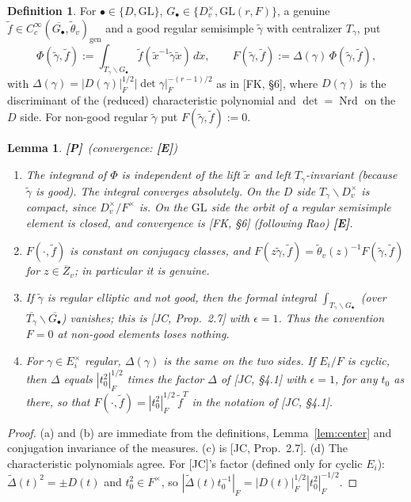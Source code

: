 \documentclass[12pt]{article}
\newcommand{\ov}[1]{\overline{#1}}
\newcommand{\eps}{\epsilon}
\newcommand{\gen}{\mathrm{gen}}
\newcommand{\Nrd}{\operatorname{Nrd}}
\newcommand{\GL}{\mathrm{GL}}
\newcommand{\Zb}{\ov{Z}}
\newcommand{\Pv}{\textbf{[P]}}
\newcommand{\Ev}{\textbf{[E]}}
\theoremstyle{plain}
\newtheorem{lemma}[theorem]{Lemma}
\theoremstyle{definition}
\newtheorem{definition}[theorem]{Definition}
\begin{document}
\begin{definition}\label{def:oi}
For $\bullet\in\{D,\GL\}$, $G_\bullet\in\{D_v^\times,\GL(r,F)\}$, a genuine $\tilde f\in C_c^\infty(\ov{G_\bullet},\tilde\theta_v)_\gen$ and a good regular semisimple $\tilde\gamma$ with centralizer $T_\gamma$, put
\[ \Phi(\tilde\gamma,\tilde f):=\int_{T_\gamma\backslash G_\bullet}\tilde f(\tilde x^{-1}\tilde\gamma\tilde x)\,d\dot x,\qquad F(\tilde\gamma,\tilde f):=\Delta(\gamma)\,\Phi(\tilde\gamma,\tilde f), \]
with $\Delta(\gamma)=|D(\gamma)|_F^{1/2}|\det\gamma|_F^{-(r-1)/2}$ as in [FK, \S6], where $D(\gamma)$ is the discriminant of the (reduced) characteristic polynomial and $\det=\Nrd$ on the $D$ side. For non-good regular $\tilde\gamma$ put $F(\tilde\gamma,\tilde f):=0$.
\end{definition}

\begin{lemma}\label{lem:oiprops}\Pv\ (convergence: \Ev)
\begin{enumerate}[label=(\alph*)]
\item The integrand of $\Phi$ is independent of the lift $\tilde x$ and left $T_\gamma$-invariant (because $\tilde\gamma$ is good). The integral converges absolutely. On the $D$ side $T_\gamma\backslash D_v^\times$ is compact, since $D_v^\times/F^\times$ is. On the $\GL$ side the orbit of a regular semisimple element is closed, and convergence is [FK, \S6] (following Rao) \Ev.
\item $F(\cdot,\tilde f)$ is constant on conjugacy classes, and $F(z\tilde\gamma,\tilde f)=\tilde\theta_v(z)^{-1}F(\tilde\gamma,\tilde f)$ for $z\in\Zb_v$; in particular it is genuine.
\item If $\tilde\gamma$ is regular elliptic and not good, then the formal integral $\int_{T_\gamma\backslash G_\bullet}$ (over $\ov{T_\gamma}\backslash\ov{G_\bullet}$) vanishes; this is [JC, Prop.~2.7] with $\eps=1$. Thus the convention $F=0$ at non-good elements loses nothing.
\item For $\gamma\in E_i^\times$ regular, $\Delta(\gamma)$ is the same on the two sides. If $E_i/F$ is cyclic, then $\Delta$ equals $|t_0^2|_F^{1/2}$ times the factor $\Delta$ of [JC, \S4.1] with $\eps=1$, for any $t_0$ as there, so that $F(\cdot,\tilde f)=|t_0^2|_F^{1/2}\,\tilde f^{T}$ in the notation of [JC, \S4.1].
\end{enumerate}
\end{lemma}
\begin{proof}
(a) and (b) are immediate from the definitions, Lemma~\ref{lem:center} and conjugation invariance of the measures. (c) is [JC, Prop.~2.7]. (d) The characteristic polynomials agree. For [JC]'s factor (defined only for cyclic $E_i$): $\tilde\Delta(t)^2=\pm D(t)$ and $t_0^2\in F^\times$, so $|\tilde\Delta(t)t_0^{-1}|_F=|D(t)|_F^{1/2}|t_0^2|_F^{-1/2}$.
\end{proof}
\end{document}
